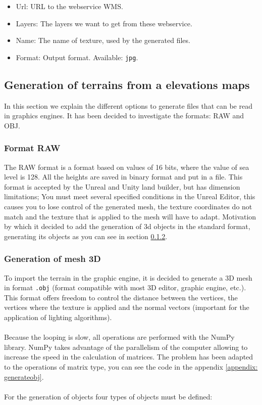 \documentclass[10pt,a4paper,twocolumn,twoside]{article}
\begin{document}
\begin{itemize}
  \begin{itemize}
  \setlength\itemsep{0em}
    \item Url: URL to the webservice WMS.
    \item Layers: The layers we want to get from these webservice.
    \item Name: The name of texture, used by the generated files.
    \item Format: Output format. Available: \texttt{jpg}.
  \end{itemize}
  
\end{itemize}


\subsection{Generation of terrains from a elevations maps}

In this section we explain the different options to generate files that can be read in graphics engines. It has been decided to investigate the formats: RAW and OBJ.

\subsubsection{Format RAW}

The RAW format is a format based on values of 16 bits, where the value of sea level is 128. All the heights are saved in binary format and put in a file. This format is accepted by the Unreal and Unity land builder, but has dimension limitations; You must meet several specified conditions in the Unreal Editor, this causes you to lose control of the generated mesh, the texture coordinates do not match and the texture that is applied to the mesh will have to adapt. Motivation by which it decided to add the generation of 3d objects in the standard format, generating its objects as you can see in section \ref{mesh3d}.

\subsubsection{Generation of mesh 3D}
\label{mesh3d}
To import the terrain in the graphic engine, it is decided to generate a 3D mesh in format \texttt{.obj} (format compatible with most 3D editor, graphic engine, etc.). This format offers freedom to control the distance between the vertices, the vertices where the texture is applied and the normal vectors (important for the application of lighting algorithms).
\\
\\
Because the looping is slow, all operations are performed with the NumPy library. NumPy takes advantage of the parallelism of the computer allowing to increase the speed in the calculation of matrices. The problem has been adapted to the operations of matrix type, you can see the code in the appendix \ref{appendix: generateobj}.
\\
\\
For the generation of objects four types of objects must be defined:
\end{document}

